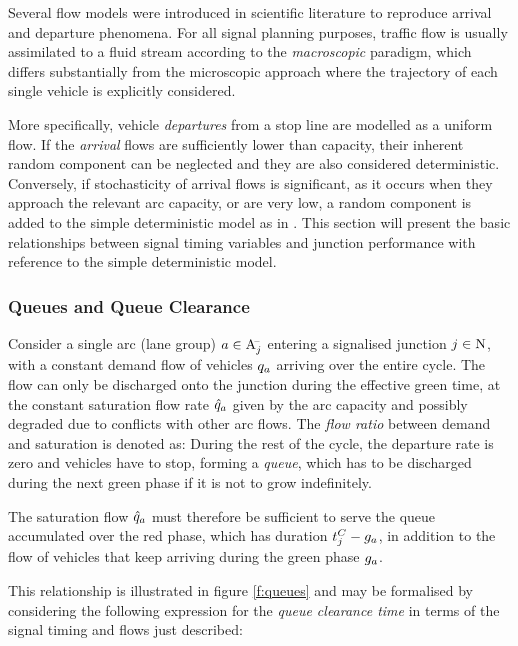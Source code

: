 Several flow models were introduced in scientific literature to reproduce arrival and departure phenomena.
For all signal planning purposes, traffic flow is usually assimilated to a fluid stream according to the \emph{macroscopic} paradigm, which differs substantially from the microscopic approach where the trajectory of each single vehicle is explicitly considered.

More specifically, vehicle \emph{departures} from a stop line are modelled as a uniform flow. If the \emph{arrival} flows are sufficiently lower than capacity, their inherent random component can be neglected and they are also considered deterministic.
Conversely, if stochasticity of arrival flows is significant, as it occurs when they approach the relevant arc capacity, or are very low, a random component is added to the simple deterministic model as in .
This section will present the basic relationships between signal timing variables and junction performance with reference to the simple deterministic model.

\subsubsection*{Queues and Queue Clearance}
Consider a single arc (lane group) $a \in \mathrm{A}_{j}^{\scriptscriptstyle{\hspace{-2pt}-}}$ entering a signalised junction $j \in \mathrm{N}$, with a constant demand flow of vehicles $q_a$ arriving over the entire cycle. The flow can only be discharged onto the junction during the effective green time, at the constant saturation flow rate $\hat{q}_a$ given by the arc capacity and possibly degraded due to conflicts with other arc flows. The \emph{flow ratio} between demand and saturation is denoted as:
During the rest of the cycle, the departure rate is zero and vehicles have to stop, forming a \emph{queue}, which has to be discharged during the next green phase if it is not to grow indefinitely. 

The saturation flow $\hat{q}_a$ must therefore be sufficient to serve the queue accumulated over the red phase, which has duration $t_{j}^C-g_{a}$, in addition to the flow of vehicles that keep arriving during the green phase $g_{a}$.

This relationship is illustrated in figure \ref{f:queues} and may be formalised by considering the following expression for the \emph{queue clearance time} in terms of the signal timing and flows just described:

